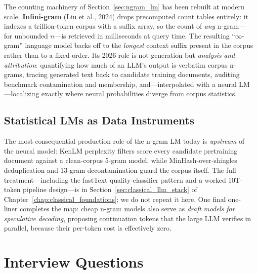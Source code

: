The counting machinery of Section~\ref{sec:ngram_lm} has been rebuilt at
modern scale.  \textbf{Infini-gram} (Liu et al., 2024) drops precomputed count
tables entirely: it indexes a trillion-token corpus with a suffix array, so
the count of \emph{any} n-gram---for unbounded $n$---is retrieved in
milliseconds at query time.  The resulting ``$\infty$-gram'' language model
backs off to the \emph{longest} context suffix present in the corpus rather
than to a fixed order.  Its 2026 role is not generation but \emph{analysis and
attribution}: quantifying how much of an LLM's output is verbatim corpus
n-grams, tracing generated text back to candidate training documents,
auditing benchmark contamination and membership, and---interpolated with a
neural LM---localizing exactly where neural probabilities diverge from corpus
statistics.

\subsection{Statistical LMs as Data Instruments}

The most consequential production role of the n-gram LM today is
\emph{upstream} of the neural model: KenLM perplexity filters score every
candidate pretraining document against a clean-corpus 5-gram model, while
MinHash-over-shingles deduplication and 13-gram decontamination guard the
corpus itself.  The full treatment---including the fastText quality-classifier
pattern and a worked 10T-token pipeline design---is in
Section~\ref{sec:classical_llm_stack} of
Chapter~\ref{chap:classical_foundations}; we do not repeat it here.  One
final one-liner completes the map: cheap n-gram models also serve as
\emph{draft models for speculative decoding}, proposing continuation tokens
that the large LLM verifies in parallel, because their per-token cost is
effectively zero.


\section{Interview Questions}
\label{sec:stat_nlp_questions}

